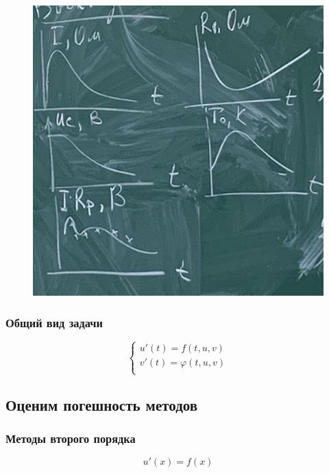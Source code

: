 \begin{figure}[H]
    \centering
    \includegraphics[scale=0.7]{img/lab_02_input.jpg}
\end{figure}

\subsubsection{Общий вид задачи}

\begin{equation*}
    \begin{cases}
        u'(t) = f(t,u,v) \\
        v'(t) = \varphi (t,u,v) \\
    \end{cases}
\end{equation*}

\subsection{Оценим погешность методов}

\subsubsection{Методы второго порядка}

\begin{equation*}
    u'(x) = f(x)
\end{equation*}

